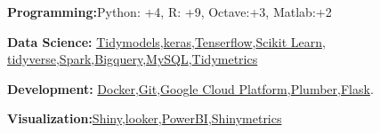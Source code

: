



\textbf{Programming:}Python: +4, R: +9, Octave:+3, Matlab:+2


\textbf{Data Science:} \href{\https://www.tidymodels.org/}{Tidymodels},\href{https://keras.io/}{keras},\href{https://www.tensorflow.org/}{Tenserflow},\href{http://scikit-learn.org}{Scikit Learn}, \href{https://www.tidyverse.org/}{tidyverse},\href{http://spark.apache.org/}{Spark},\href{https://cloud.google.com/bigquery/?&utm_source=google&utm_medium=cpc&utm_campaign=latam-CO-all-es-dr-skws-all-all-trial-e-dr-1008075-LUAC0009164&utm_content=text-ad-none-none-DEV_c-CRE_431372551908-ADGP_SKWS+%7C+Multi+~+Big+Data+%7C+Big+Query-KWID_43700042625176868-kwd-372661971564-userloc_1003659&utm_term=KW_bigquery-ST_BigQuery&gclid=CjwKCAjwv4_1BRAhEiwAtMDLsoLVCuOjXJgg1dLlDJeFmM1zSswmEzh1U-QCR1dqziKckDttHE_B7BoC7lkQAvD_BwE&gclsrc=aw.ds}{Bigquery},\href{https://www.mysql.com/}{MySQL},\href{https://github.com/datacamp/tidymetrics}{Tidymetrics}

\textbf{Development:} \href{https://www.docker.com/}{Docker},\href{https://www.github.com}{Git},\href{https://cloud.google.com/}{Google Cloud Platform},\href{https://www.rplumber.io/}{Plumber},\href{https://flask.palletsprojects.com/en/1.1.x/}{Flask}.

\textbf{Visualization:}\href{https://shiny.rstudio.com/}{Shiny},\href{https://looker.com/}{looker},\href{https://powerbi.microsoft.com/es-es/}{PowerBI},\href{https://github.com/datacamp/shinymetrics}{Shinymetrics}




